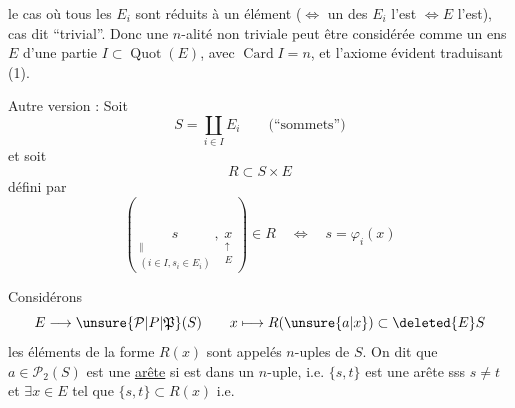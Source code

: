 le cas où tous les $E_i$ sont réduits à un
élément  ($\Leftrightarrow$  un des $E_i$ l'est $\Leftrightarrow E$ l'est),
cas dit ``trivial''. Donc une $n$-alité non
triviale peut être considérée comme
un ens $E$  d'une partie
$I\subset\operatorname{Quot}(E)$, avec $\operatorname{Card} I=n$, et 
l'axiome évident traduisant (1).

Autre version : Soit 
\[
S=\coprod_{i\in I}E_i\qquad\text{(``sommets'')}
\tag*{(2)}
\]
et  soit
\[
R\subset S\times E \tag*{(3)}
\]
défini par
\[
(\underset{\substack{\Vert\\(i\in I,s_i\in E_i)}}{s},
 \underset{\substack{\uparrow\\E}}{x})\in R\quad\Longleftrightarrow\quad
s=\varphi_i(x)
\]


Considérons
\[
E\longrightarrow \unsure{\mathcal P|P|\mathfrak P}(S)\qquad x\longmapsto R(\unsure{a|x})\subset\deleted{E}S
\]
les éléments de  la forme $R(x)$ sont
appelés $n$-uples de $S$. On dit que
$a\in\mathcal P_2(S)$ est une \uline{arête} si  est 
dans un $n$-uple, i.e. $\{s,t\}$ est une arête
sss $s\ne t$ et $\exists x\in E$ tel que $\{s,t\}\subset R(x)$ i.e.

